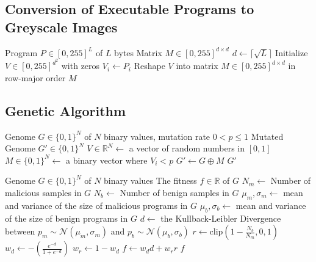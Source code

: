 \documentclass[conference,compsoc]{IEEEtran}
\begin{document}
\subsection{Conversion of Executable Programs to Greyscale Images}\label{apdx:prog-to-img}

\begin{algorithm}[H]
\caption{Convert a program to an image}
\begin{algorithmic}[1]
\REQUIRE Program \(P \in {[0, 255]}^L\) of \(L\) bytes 
\ENSURE Matrix \(M \in [0, 255]^{d \times d}\)
\STATE \(d \gets \lceil \sqrt{L} \rceil\)
\STATE Initialize \(V \in [0, 255]^{d^2}\) with zeros
    \STATE \(V_i \gets P_i\)
\ENDFOR
\STATE Reshape \(V\) into matrix \(M \in [0, 255]^{d \times d}\) in row-major order
\RETURN \(M\)
\end{algorithmic}
\end{algorithm}


\subsection{Genetic Algorithm}\label{apdx:ga}

\begin{algorithm}[H]
\caption{Apply a random mutation to a genotype}
\label{algo:mutate}
\begin{algorithmic}[1]
\REQUIRE Genome \(G \in \{0, 1\}^N\) of \(N\) binary values, mutation rate \(0 < p \leq 1\) 
\ENSURE Mutated Genome \(G' \in \{0, 1\}^N\) 
\STATE \(V \in \mathbb{R}^N \gets\) a vector of random numbers in \([0, 1]\) 
\STATE \(M \in \{0, 1\}^N \gets\) a binary vector where \(V_i < p\) 
\STATE \(G' \gets G \oplus M\) 
\RETURN \(G'\)
\end{algorithmic}
\end{algorithm}

\begin{algorithm}[H]
\caption{Compute the fitness of a genotype}
\label{algo:fitness}
\begin{algorithmic}[1]
\REQUIRE Genome \(G \in \{0, 1\}^N\) of \(N\) binary values
\ENSURE The fitness \(f \in \mathbb{R}\) of \(G\) 
\STATE \(N_m \gets \) Number of malicious samples in \(G\)
\STATE \(N_b \gets \) Number of benign samples in \(G\)
\STATE \(\mu_m, \sigma_m \gets\) mean and variance of the size of malicious programs in \(G\)
\STATE \(\mu_b, \sigma_b \gets\) mean and variance of the size of benign programs in \(G\) 
\STATE \(d \gets\) the Kullback-Leibler Divergence between \(p_m \sim \mathcal{N}\left(\mu_m, \sigma_m\right)\) and \(p_b \sim \mathcal{N}\left(\mu_b, \sigma_b\right)\)
\STATE \(r \gets \text{clip}\left(1 - \frac{N_b}{N_m}, 0, 1\right)\)
\STATE \(w_d \gets - \left(\frac{e^{-d}}{1 + e^{-d}}\right)\)
\STATE \(w_r \gets 1 - w_d\)
\STATE \(f \gets w_d d + w_r r\)
\RETURN \(f\)
\end{algorithmic}
\end{algorithm}
\end{document}
